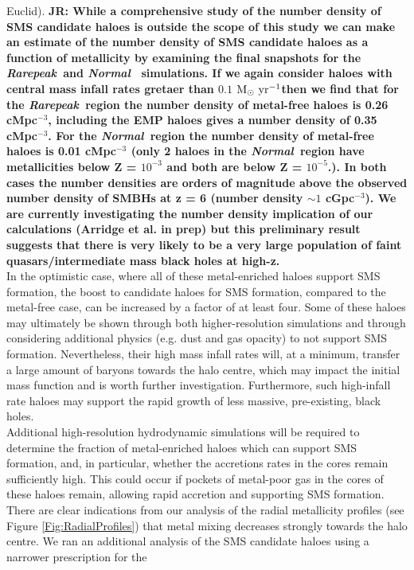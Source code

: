 \documentclass[twocolumn,iop,revtex4]{openjournal}
\newcommand{\msolaryrc} {$\rm{M_{\odot}~yr^{-1}}$}
\newcommand{\rarepeak} {\textit{Rarepeak~}}
\newcommand{\normal} {\textit{Normal~}}
\def\jr#1{{\color{blue} \bf JR:  #1}}
\begin{document}
Euclid). \jr{While a comprehensive study of the number density of SMS candidate haloes is outside the
scope of this study we can make an estimate of the number density of SMS candidate
haloes as a function of metallicity by examining the final snapshots for the \rarepeak and \normal
simulations. If we again consider haloes with central mass infall rates gretaer than $0.1$
\msolaryrc then we find that for the \rarepeak region the number density of metal-free haloes
is 0.26 cMpc$^{-3}$, including the EMP haloes gives a number density of 0.35 cMpc$^{-3}$. For
the \normal region the number density of metal-free haloes is 0.01 cMpc$^{-3}$ (only 2 haloes
in the \normal region have metallicities below Z = $10^{-3}$ and both are below Z = $10^{-5}$.). In
both cases the number densities are orders of magnitude above the observed number density of
SMBHs at z = 6 (number density $\sim 1$ cGpc$^{-3}$). We are currently investigating the number
density implication of our calculations (Arridge et al. in prep) but this preliminary result
suggests that there is very likely to be a very large population of faint quasars/intermediate mass
black holes at high-z.}
\\
\indent In the optimistic case, where all of these metal-enriched haloes support SMS formation, the
boost to
candidate haloes for SMS formation, compared to the metal-free case, can be increased by a factor of
at least four. Some of these haloes may ultimately be shown through both  higher-resolution simulations
and through considering additional physics (e.g. dust and gas opacity) 
to not support SMS formation. Nevertheless, their high mass infall rates will, at a minimum, transfer
a large amount of baryons towards the halo centre, which may impact the initial mass function and
is worth further investigation. Furthermore, such high-infall rate haloes may support the rapid
growth of less massive, pre-existing, black holes. \\
\indent Additional high-resolution hydrodynamic simulations will be required to
determine the fraction of metal-enriched haloes which can support SMS formation, and, in particular,
whether the accretions rates in the cores remain sufficiently high.  This could occur if pockets
of metal-poor gas in the cores of these haloes remain, allowing rapid accretion and supporting SMS
formation. There are clear indications from our analysis of the radial metallicity profiles
(see Figure \ref{Fig:RadialProfiles}) that metal mixing decreases strongly towards the halo centre.
We ran an additional analysis of the SMS candidate haloes using a narrower prescription for the
\end{document}
